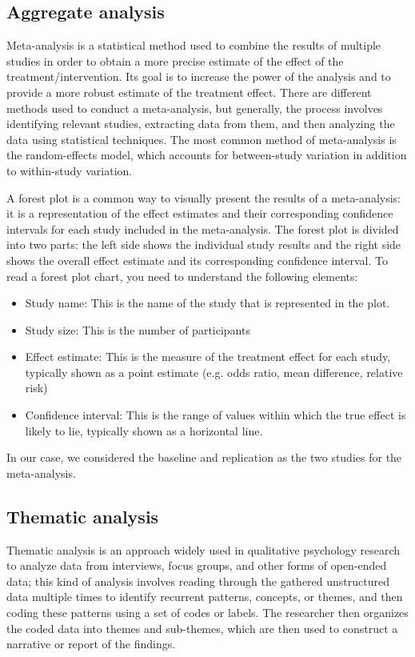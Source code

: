 \subsection{Aggregate analysis}
Meta-analysis is a statistical method used to combine the results of multiple studies in order to obtain a more precise estimate of the effect of the treatment/intervention. Its goal is to increase the power of the analysis and to provide a more robust estimate of the treatment effect.
There are different methods used to conduct a meta-analysis, but generally, the process involves identifying relevant studies, extracting data from them, and then analyzing the data using statistical techniques. The most common method of meta-analysis is the random-effects model, which accounts for between-study variation in addition to within-study variation.

A forest plot is a common way to visually present the results of a meta-analysis: it is a representation of the effect estimates and their corresponding confidence intervals for each study included in the meta-analysis. The forest plot is divided into two parts: the left side shows the individual study results and the right side shows the overall effect estimate and its corresponding confidence interval.
To read a forest plot chart, you need to understand the following elements:
\begin{itemize}
    \item Study name: This is the name of the study that is represented in the plot.
    \item Study size: This is the number of participants
    \item Effect estimate: This is the measure of the treatment effect for each study, typically shown as a point estimate (e.g. odds ratio, mean difference, relative risk)
    \item Confidence interval: This is the range of values within which the true effect is likely to lie, typically shown as a horizontal line.
\end{itemize}

In our case, we considered the baseline and replication as the two studies for the meta-analysis.

\subsection{Thematic analysis}
Thematic analysis is an approach widely used in qualitative psychology research to analyze data from interviews, focus groups, and other forms of open-ended data; this kind of analysis involves reading through the gathered unstructured data multiple times to identify recurrent patterns, concepts, or themes, and then coding these patterns using a set of codes or labels. The researcher then organizes the coded data into themes and sub-themes, which are then used to construct a narrative or report of the findings.

